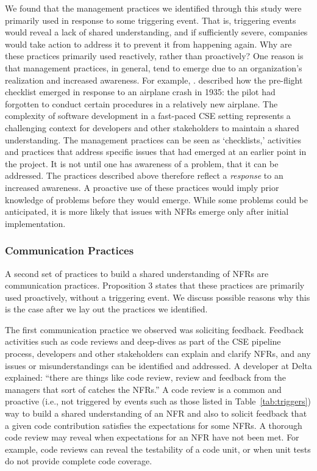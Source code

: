 \documentclass[smallextended]{svjour3}       %
\begin{document}
We found that the management practices we identified through this study were primarily used in response to some triggering event. That is, triggering events would reveal a lack of shared understanding, and if sufficiently severe, companies would take action to address it to prevent it from happening again. 
Why are these practices primarily used reactively, rather than proactively? 
One reason is that management practices, in general, tend to emerge due to an organization's realization and increased awareness. For example, \citet[p. 33]{gawande2010checklist}. described how the pre-flight checklist emerged in response to an airplane crash in 1935: the pilot had forgotten to conduct certain procedures in a relatively new airplane. The complexity of software development in a fast-paced CSE setting represents a challenging context for developers and other stakeholders to maintain a shared understanding. The management practices can be seen as `checklists,' activities and practices that address specific issues that had emerged at an earlier point in the project.
It is not until one has awareness of a problem, that it can be addressed.  
The practices described above therefore reflect a \textit{response} to an increased awareness. A proactive use of these practices would imply prior knowledge of problems before they would emerge. While some problems could be anticipated, it is more likely that issues with NFRs emerge only after initial implementation.


\subsubsection{Communication Practices}
\label{sub:communication}
A second set of practices to build a shared understanding of NFRs are communication practices. Proposition 3 states that these practices are primarily used proactively, without a triggering event. We discuss possible reasons why this is the case after we lay out the practices we identified.

The first communication practice we observed was soliciting feedback. Feedback activities such as code reviews and deep-dives as part of the CSE pipeline process, developers and other stakeholders can explain and clarify NFRs, and any issues or misunderstandings can be identified and addressed. A developer at Delta explained: 
\textmd{``there are things like code review, review and feedback from the managers that sort of catches the NFRs.''}
A code review is a common and proactive (i.e., not triggered by events such as those listed in Table~\ref{tab:triggers}) way to build a shared understanding of an NFR and also to solicit feedback that a given code contribution satisfies the expectations for some NFRs.
A thorough code review may reveal when 
expectations for an NFR have not been met. For example, code reviews can reveal the testability of a code unit, or when unit tests do not provide complete code coverage. 
\end{document}
